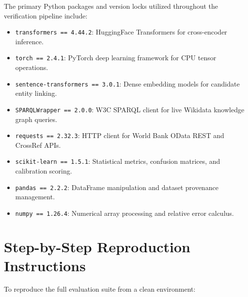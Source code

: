 The primary Python packages and version locks utilized throughout the verification pipeline include:
\begin{itemize}
    \item \texttt{transformers == 4.44.2}: HuggingFace Transformers for cross-encoder inference.
    \item \texttt{torch == 2.4.1}: PyTorch deep learning framework for CPU tensor operations.
    \item \texttt{sentence-transformers == 3.0.1}: Dense embedding models for candidate entity linking.
    \item \texttt{SPARQLWrapper == 2.0.0}: W3C SPARQL client for live Wikidata knowledge graph queries.
    \item \texttt{requests == 2.32.3}: HTTP client for World Bank OData REST and CrossRef APIs.
    \item \texttt{scikit-learn == 1.5.1}: Statistical metrics, confusion matrices, and calibration scoring.
    \item \texttt{pandas == 2.2.2}: DataFrame manipulation and dataset provenance management.
    \item \texttt{numpy == 1.26.4}: Numerical array processing and relative error calculus.
\end{itemize}

\section{Step-by-Step Reproduction Instructions}
\label{sec:app_reproduction_steps}

To reproduce the full evaluation suite from a clean environment:

